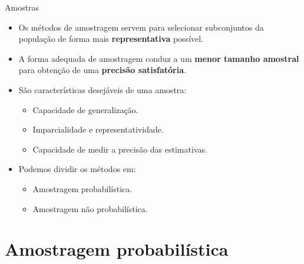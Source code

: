 \documentclass[
  ignorenonframetext,
  serif,
  professionalfont,
  usenames,
  dvipsnames,
  aspectratio = 169]{beamer}
\providecommand{\tightlist}{%
  \setlength{\itemsep}{0pt}\setlength{\parskip}{0pt}}
\renewcommand{\tightlist}{%
  \setlength{\itemsep}{0\baselineskip}
  \setlength{\parskip}{0.25\baselineskip}
}
\def\beginAHalfColumn{\begin{minipage}{0.49\textwidth}}%
\def\endColumns{\end{minipage}}%
\begin{document}
\begin{frame}{Amostras}
\protect\hypertarget{amostras-1}{}
\beginAHalfColumn

\begin{itemize}
\item
  Os métodos de amostragem servem para selecionar subconjuntos da
  população de forma mais \textbf{representativa} possível.
\item
  A forma adequada de amostragem conduz a um
  \textbf{menor tamanho amostral} para obtenção de uma
  \textbf{precisão satisfatória}.
\end{itemize}

\endColumns
\beginAHalfColumn

\begin{itemize}
\tightlist
\item
  São características desejáveis de uma amostra:

  \begin{itemize}
  \tightlist
  \item
    Capacidade de generalização.
  \item
    Imparcialidade e representatividade.
  \item
    Capacidade de medir a precisão das estimativas.
  \end{itemize}
\item
  Podemos dividir os métodos em:

  \begin{itemize}
  \tightlist
  \item
    Amostragem probabilística.
  \item
    Amostragem não probabilística.
  \end{itemize}
\end{itemize}

\endColumns
\end{frame}

\hypertarget{amostragem-probabiluxedstica}{%
\section{Amostragem probabilística}\label{amostragem-probabiluxedstica}}
\end{document}
